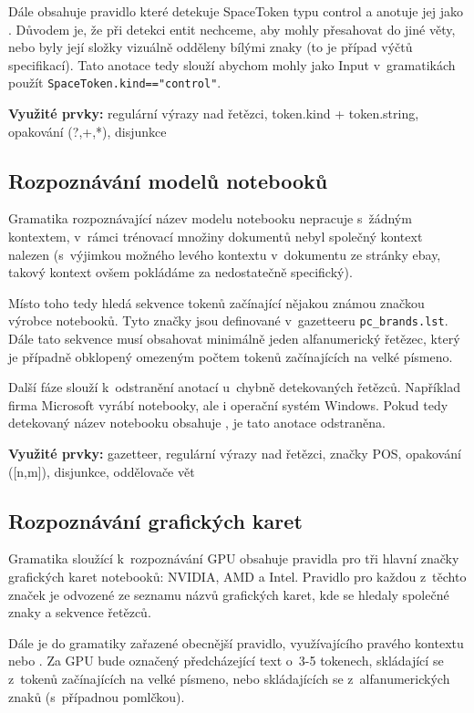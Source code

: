 \documentclass[a4,12pt]{article}
\let\Oldsubsection\subsection
\renewcommand{\subsection}{\FloatBarrier\Oldsubsection}
\begin{document}
Dále obsahuje pravidlo které detekuje SpaceToken typu control a anotuje jej jako . Důvodem je, že při detekci entit nechceme, aby mohly přesahovat do jiné věty, nebo byly její složky vizuálně odděleny bílými znaky (to je případ výčtů specifikací). Tato anotace tedy slouží abychom mohly jako Input v~gramatikách použít \texttt{SpaceToken.kind=="control"}.

\textbf{Využité prvky:} regulární výrazy nad řetězci, token.kind + token.string, opakování (?,+,*), disjunkce
\subsection{Rozpoznávání modelů notebooků}
Gramatika rozpoznávající název modelu notebooku nepracuje s~žádným kontextem, v~rámci trénovací množiny dokumentů nebyl společný kontext nalezen (s~výjimkou možného levého kontextu  v~dokumentu ze stránky ebay, takový kontext ovšem pokládáme za nedostatečně specifický). 

Místo toho tedy hledá sekvence tokenů začínající nějakou známou značkou výrobce notebooků. Tyto značky jsou definované v~gazetteeru \texttt{pc\_brands.lst}. Dále tato sekvence musí obsahovat minimálně jeden alfanumerický řetězec, který je případně obklopený omezeným počtem tokenů začínajících na velké písmeno.

Další fáze slouží k~odstranění anotací u~chybně detekovaných řetězců. Například firma Microsoft vyrábí notebooky, ale i operační systém Windows. Pokud tedy detekovaný název notebooku obsahuje , je tato anotace odstraněna.

\textbf{Využité prvky:} gazetteer, regulární výrazy nad řetězci, značky POS, opakování ([n,m]), disjunkce, oddělovače vět 
\subsection{Rozpoznávání grafických karet}
Gramatika sloužící k~rozpoznávání GPU obsahuje pravidla pro tři hlavní značky grafických karet notebooků: NVIDIA, AMD a Intel. Pravidlo pro každou z~těchto značek je odvozené ze seznamu názvů grafických karet, kde se hledaly společné znaky a sekvence řetězců.

Dále je do gramatiky zařazené obecnější pravidlo, využívajícího pravého kontextu  nebo . Za GPU bude označený předcházející text o~3-5 tokenech, skládající se z~tokenů začínajících na velké písmeno, nebo skládajících se z~alfanumerických znaků (s~případnou pomlčkou).
\end{document}

